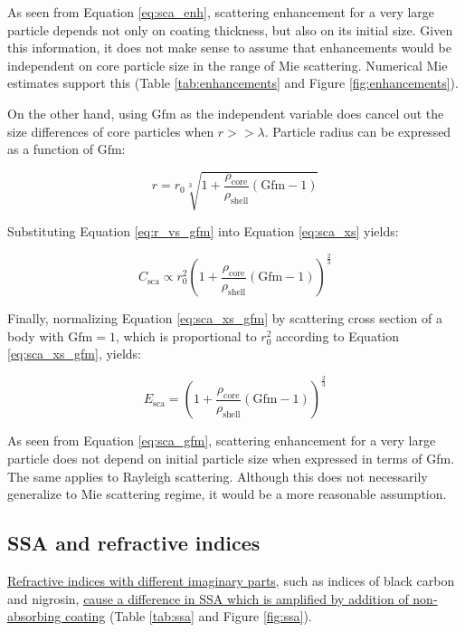 \documentclass[12pt]{article}
\begin{document}
As seen from Equation \ref{eq:sca_enh}, scattering enhancement for a very large particle depends not only on coating thickness, but also on its initial size. Given this information, it does not make sense to assume that enhancements would be independent on core particle size in the range of Mie scattering. Numerical Mie estimates support this (Table \ref{tab:enhancements} and Figure \ref{fig:enhancements}).

On the other hand, using $\mathrm{Gfm}$ as the independent variable does cancel out the size differences of core particles when $r>>\lambda$. Particle radius can be expressed as a function of $\mathrm{Gfm}$:

\begin{equation}
    r=r_0\sqrt[3]{1+\frac{\rho_{\mathrm{core}}}{\rho_{\mathrm{shell}}}\left(\mathrm{Gfm}-1\right)}
    \label{eq:r_vs_gfm}
\end{equation}

Substituting Equation \ref{eq:r_vs_gfm} into Equation \ref{eq:sca_xs} yields:

\begin{equation}
    C_{\mathrm{sca}}\propto r_0^2\left(1+\frac{\rho_{\mathrm{core}}}{\rho_{\mathrm{shell}}}\left(\mathrm{Gfm}-1\right)\right)^\frac{2}{3}
    \label{eq:sca_xs_gfm}
\end{equation}

Finally, normalizing Equation \ref{eq:sca_xs_gfm} by scattering cross section of a body with $\mathrm{Gfm}=1$, which is proportional to $r_0^2$ according to Equation \ref{eq:sca_xs_gfm}, yields:

\begin{equation}
    E_{\mathrm{sca}}=\left(1+\frac{\rho_{\mathrm{core}}}{\rho_{\mathrm{shell}}}\left(\mathrm{Gfm}-1\right)\right)^\frac{2}{3}
    \label{eq:sca_gfm}
\end{equation}

As seen from Equation \ref{eq:sca_gfm}, scattering enhancement for a very large particle does not depend on initial particle size when expressed in terms of Gfm. The same applies to Rayleigh scattering. Although this does not necessarily generalize to Mie scattering regime, it would be a more reasonable assumption.

\subsection*{SSA and refractive indices}

\ul{Refractive indices with different imaginary parts}, such as indices of black carbon and nigrosin, \ul{cause a difference in SSA which is amplified by addition of non-absorbing coating} (Table \ref{tab:ssa} and Figure \ref{fig:ssa}).
\end{document}

